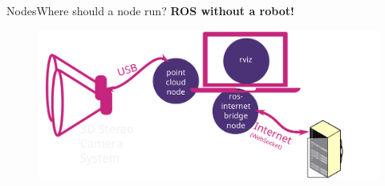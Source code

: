 \documentclass[aspectratio=169]{beamer}
\begin{document}
  \begin{frame}[plain]{Nodes}{Where should a node run?}
    \textbf{ROS without a robot!}
      \begin{figure}[tbh!]
        \centering
        \includegraphics[width=.9\textwidth]{./figures/ros_nodes_example_3.pdf}
      \end{figure}

  \end{frame}
\end{document}

